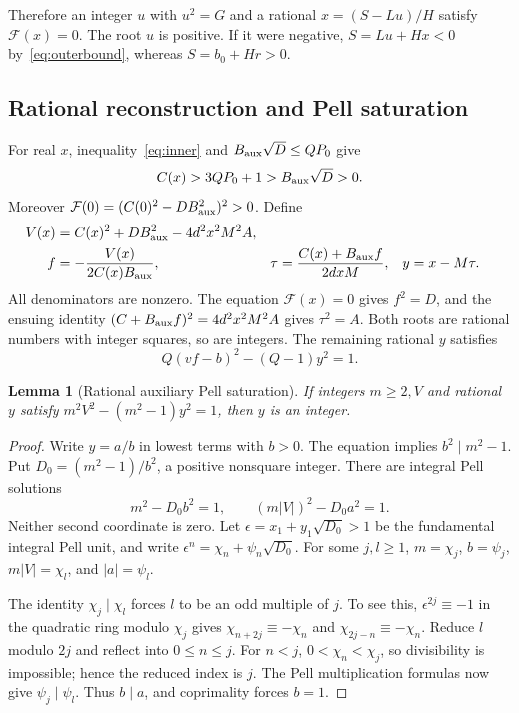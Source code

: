 \documentclass[11pt,a4paper]{article}
\newtheorem{lemma}[theorem]{Lemma}
\theoremstyle{remark}\newtheorem{remark}[theorem]{Remark}
\begin{document}
Therefore an integer $u$ with $u^2=G$ and a rational
$x=(S-Lu)/H$ satisfy $\mathcal F(x)=0$.
The root $u$ is positive. If it were negative,
$S=Lu+Hx<0$ by~\eqref{eq:outerbound}, whereas $S=b_0+Hr>0$.

\subsection{Rational reconstruction and Pell saturation}

For real $x$, inequality~\eqref{eq:inner} and
$B_{\rm aux}\sqrt D\le QP_0$ give
\[
 C(x)>3QP_0+1>B_{\rm aux}\sqrt D>0.
\]
Moreover $\mathcal F(0)=(C(0)^2-DB_{\rm aux}^2)^2>0$.
Define
\begin{align*}
 V(x)&=C(x)^2+DB_{\rm aux}^2-4d^2x^2M^2A,\\
 f&=-\frac{V(x)}{2C(x)B_{\rm aux}},&
 \tau&=\frac{C(x)+B_{\rm aux}f}{2dxM},&
 y&=x-M\tau.
\end{align*}
All denominators are nonzero. The equation $\mathcal F(x)=0$ gives
$f^2=D$, and the ensuing identity
$(C+B_{\rm aux}f)^2=4d^2x^2M^2A$ gives $\tau^2=A$.
Both roots are rational numbers with integer squares, so are integers.
The remaining rational $y$ satisfies
\begin{equation}
 Q(vf-b)^2-(Q-1)y^2=1.\label{eq:saturationinstance}
\end{equation}

\begin{lemma}[Rational auxiliary Pell saturation]
\label{lem:saturation}
If integers $m\ge2,V$ and rational $y$ satisfy
$m^2V^2-(m^2-1)y^2=1$, then $y$ is an integer.
\end{lemma}
\begin{proof}
Write $y=a/b$ in lowest terms with $b>0$. The equation implies
$b^2\mid m^2-1$. Put $D_0=(m^2-1)/b^2$, a positive nonsquare integer.
There are integral Pell solutions
\[
 m^2-D_0b^2=1,\qquad (m|V|)^2-D_0a^2=1.
\]
Neither second coordinate is zero. Let
$\epsilon=x_1+y_1\sqrt{D_0}>1$ be the fundamental integral Pell unit,
and write $\epsilon^n=\chi_n+\psi_n\sqrt{D_0}$.
For some $j,l\ge1$, $m=\chi_j$, $b=\psi_j$,
$m|V|=\chi_l$, and $|a|=\psi_l$.

The identity $\chi_j\mid\chi_l$ forces $l$ to be an odd multiple of $j$.
To see this, $\epsilon^{2j}\equiv-1$ in the quadratic ring modulo
$\chi_j$ gives $\chi_{n+2j}\equiv-\chi_n$ and
$\chi_{2j-n}\equiv-\chi_n$. Reduce $l$ modulo $2j$ and reflect into
$0\le n\le j$. For $n<j$, $0<\chi_n<\chi_j$, so divisibility is
impossible; hence the reduced index is $j$.
The Pell multiplication formulas now give $\psi_j\mid\psi_l$.
Thus $b\mid a$, and coprimality forces $b=1$.
\end{proof}
\end{document}
